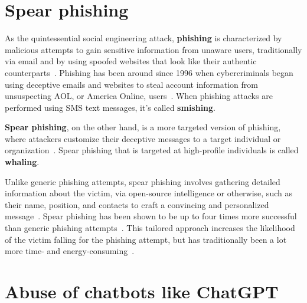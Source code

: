 \section{Spear phishing}
\begin{comment}
\end{comment}


%
%
As the quintessential social engineering attack, \textbf{phishing} is characterized by malicious attempts to gain sensitive information from unaware users, traditionally via email and by using spoofed websites that look like their authentic counterparts~\citep{basit_Comprehensive_Survey_AI_Phishing_Detection_2021}. Phishing has been around since 1996 when cybercriminals began using deceptive emails and websites to steal account information from unsuspecting AOL, or America Online, users~\citep{wang_Defining_Social_Engineering_2020}. When phishing attacks are performed using SMS text messages, it’s called \textbf{smishing}.


%
%
\textbf{Spear phishing}, on the other hand, is a more targeted version of phishing, where attackers customize their deceptive messages to a target individual or organization~\citep{fakhouri_AI_Driven_Solutions_SE_Attacks_2024}. Spear phishing that is targeted at high-profile individuals is called \textbf{whaling}.


%
%
Unlike generic phishing attempts, spear phishing involves gathering detailed information about the victim, via open-source intelligence or otherwise, such as their name, position, and contacts to craft a convincing and personalized message~\citep{wang_Defining_Social_Engineering_2020}. Spear phishing has been shown to be up to four times more successful than generic phishing attempts~\citep{king_AI_Crime_Interdisciplinary_Analysis_2019}. This tailored approach increases the likelihood of the victim falling for the phishing attempt, but has traditionally been a lot more time- and energy-consuming~\citep {mirsky_Threat_Offensive_AI_Organizations_2023}.






\section{Abuse of chatbots like ChatGPT}
\begin{comment}
\end{comment}

